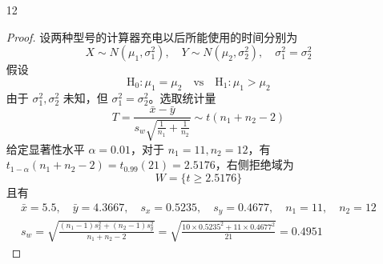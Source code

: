 \documentclass[normal,founder,mtpro2,cn]{elegantnote}
\begin{document}
\begin{enumerate}
\begin{proof}
\begin{enumerate}
                      \begin{equation*}
                          W=\{t\geq 1.8331\}
                      \end{equation*}
                      且有
                      \begin{equation*}
                          \bar{x}=100.104,\quad\mu=100,\quad s=0.4760,\quad n=10
                      \end{equation*}
                      则
                      \begin{equation*}
                          t=\frac{100.104-100}{0.4760/\sqrt{10}}=0.6910\notin W
                      \end{equation*}
                      故接受原假设，即不能认为 $\mu>100$。
            \end{enumerate}
        \end{proof}
    \item[12]
        \begin{proof}
            设两种型号的计算器充电以后所能使用的时间分别为
            \begin{equation*}
                X\sim N\left(\mu_{1},\sigma_{1}^{2}\right),\quad Y\sim N\left(\mu_{2},\sigma_{2}^{2}\right),\quad\sigma_{1}^{2}=\sigma_{2}^{2}
            \end{equation*}
            假设
            \begin{equation*}
                \mathrm{H}_{0}:\mu_{1}=\mu_{2}\quad\text{vs}\quad \mathrm{H}_{1}:\mu_{1}>\mu_{2}
            \end{equation*}
            由于 $\sigma_{1}^{2},\sigma_{2}^{2}$ 未知，但 $\sigma_{1}^{2}=\sigma_{2}^{2}$。选取统计量
            \begin{equation*}
                T=\frac{\bar{x}-\bar{y}}{s_{w}\sqrt{\frac{1}{n_{1}}+\frac{1}{n_{2}}}}\sim t\left(n_{1}+n_{2}-2\right)
            \end{equation*}
            给定显著性水平 $\alpha=0.01$，对于 $n_{1}=11,n_{2}=12$，有 $t_{1-\alpha}\left(n_{1}+n_{2}-2\right)=t_{0.99}(21)=2.5176$，右侧拒绝域为
            \begin{equation*}
                W=\{t \geq 2.5176\}
            \end{equation*}
            且有
            \begin{gather*}
                \bar{x}=5.5,\quad\bar{y}=4.3667,\quad s_{x}=0.5235, \quad s_{y}=0.4677,\quad n_{1}=11,\quad n_{2}=12 \\
                s_{w}=\sqrt{\frac{\left(n_{1}-1\right)s_{x}^{2}+\left(n_{2}-1\right)s_{y}^{2}}{n_{1}+n_{2}-2}}=\sqrt{\frac{10\times 0.5235^{2}+11\times 0.4677^{2}}{21}}=0.4951

\end{gather*}
\end{proof}
\end{enumerate}
\end{document}

